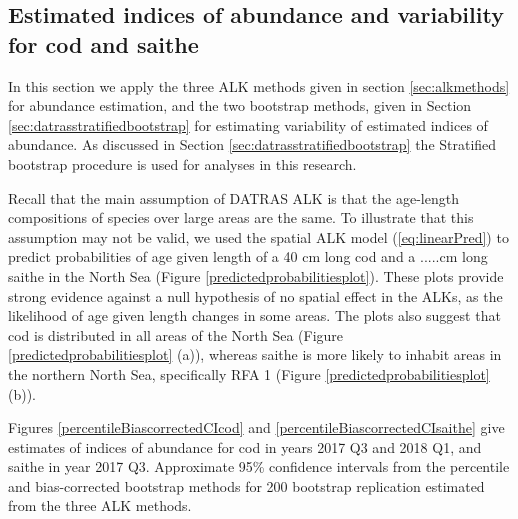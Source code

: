 \documentclass[a4paper 12pt]{article}
\numberwithin{equation}{section}
\begin{document}
\subsection{Estimated indices of abundance and variability for cod and saithe}
\label{sec:codresults}

In this section we apply the three ALK methods given in section \ref{sec:alkmethods} for abundance estimation, and the two bootstrap methods, given in Section \ref{sec:datrasstratifiedbootstrap} for estimating variability of estimated indices of abundance. As discussed in Section \ref{sec:datrasstratifiedbootstrap} the Stratified bootstrap procedure is used for analyses in this research.

Recall that the main assumption of DATRAS ALK is that the age-length compositions of species over large areas are the same. To illustrate that this assumption may not be valid, we used  the spatial ALK model (\ref{eq:linearPred}) to predict probabilities of age given length of a 40 cm long cod and a .....cm long saithe in the North Sea (Figure \ref{predictedprobabilitiesplot}). These plots provide strong evidence against a null hypothesis of no spatial effect in the ALKs, as the likelihood of age given length changes in some areas. The plots also suggest that cod is distributed in all areas of the North Sea (Figure \ref{predictedprobabilitiesplot} (a)), whereas saithe is more likely to inhabit areas in the northern North Sea, specifically RFA 1 (Figure \ref{predictedprobabilitiesplot} (b)). 


%

\clearpage
Figures \ref{percentileBiascorrectedCIcod} and  \ref{percentileBiascorrectedCIsaithe} give estimates of indices of abundance for cod in years 2017 Q3 and 2018 Q1, and  saithe in year 2017 Q3. Approximate 95\% confidence intervals from the percentile and bias-corrected bootstrap methods for 200 bootstrap replication estimated from the three ALK methods.
\end{document}
